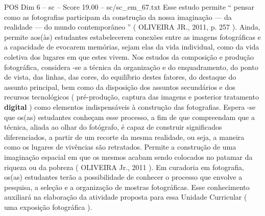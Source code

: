 \begin{textsample}{POS Dim 6 – sc – Score 19.00 – sc/sc\_em\_67.txt}
Esse estudo permite “ pensar como as fotografias participam da construção da nossa imaginação — da realidade — do mundo contemporâneo ” ( OLIVEIRA JR., 2011, p. 257 ).
Ainda, permite aos(às) estudantes estabelecerem conexões entre as imagens fotográficas e a capacidade de evocarem memórias, sejam elas da vida individual, como da vida coletiva dos lugares em que estes vivem.
Nos estudos da composição e produção fotográfica, considera -se a técnica da organização e do enquadramento, do ponto de vista, das linhas, das cores, do equilíbrio destes fatores, do destaque do assunto principal, bem como da disposição dos assuntos secundários e dos recursos tecnológicos ( pré-produção, captura das imagens e posterior tratamento \textbf{digital} ) como elementos indispensáveis à construção das fotografias.
Espera -se que os(as) estudantes conheçam esse processo, a fim de que compreendam que a técnica, aliada ao olhar do fotógrafo, é capaz de construir significados diferenciados, a partir de um recorte da mesma realidade, ou seja, a maneira como os lugares de vivências são retratados.
Permite a construção de uma imaginação espacial em que os mesmos acabam sendo colocados no patamar da riqueza ou da pobreza ( OLIVEIRA Jr., 2011 ).
Em curadoria em fotografia, os(as) estudantes terão a possibilidade de conhecer o processo que envolve a pesquisa, a seleção e a organização de mostras fotográficas.
Esse conhecimento auxiliará na elaboração da atividade proposta para essa Unidade Curricular ( uma exposição fotográfica ).

\end{textsample}
